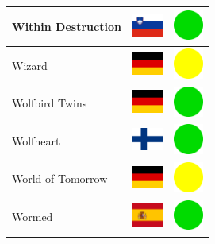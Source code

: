 \documentclass[12pt, a4paper, twoside]{report}
\begin{document}
\begin{center}
\begin{longtable}{|p{5cm}|p{2cm}|p{2cm}|}
 Within Destruction                                         & \includegraphics[width=1cm]{../img/flags/si} &   \includegraphics[width=1cm]{../likes/y} \\ \hline
 Wizard                                                     & \includegraphics[width=1cm]{../img/flags/de} &   \includegraphics[width=1cm]{../likes/m} \\ \hline
 Wolfbird Twins                                             & \includegraphics[width=1cm]{../img/flags/de} &   \includegraphics[width=1cm]{../likes/y} \\ \hline
 Wolfheart                                                  & \includegraphics[width=1cm]{../img/flags/fi} &   \includegraphics[width=1cm]{../likes/y} \\ \hline
 World of Tomorrow                                          & \includegraphics[width=1cm]{../img/flags/de} &   \includegraphics[width=1cm]{../likes/m} \\ \hline
 Wormed                                                     & \includegraphics[width=1cm]{../img/flags/es} &   \includegraphics[width=1cm]{../likes/y} \\ \hline

\end{longtable}
\end{center}
\end{document}
